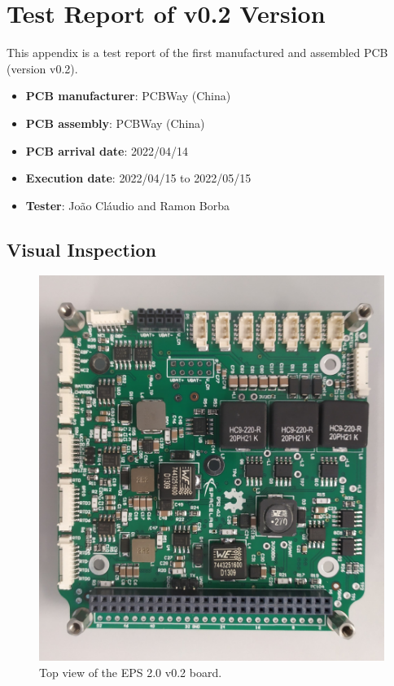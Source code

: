 %
%
%
%
%

%
%
%
%
%
%

\chapter{Test Report of v0.2 Version} \label{anx:test-report-v01}

This appendix is a test report of the first manufactured and assembled PCB (version v0.2).

\begin{itemize}
    \item \textbf{PCB manufacturer}: PCBWay (China)
    \item \textbf{PCB assembly}: PCBWay (China)
    \item \textbf{PCB arrival date}: 2022/04/14 
    \item \textbf{Execution date}: 2022/04/15 to 2022/05/15
    \item \textbf{Tester}: João Cláudio and Ramon Borba
\end{itemize}

\section{Visual Inspection}

\begin{figure}[!ht]
    \begin{center}
        \includegraphics[width=0.6\columnwidth]{figures/v02/eps2-v02-top.jpg}
        \caption{Top view of the EPS 2.0 v0.2 board.}
        \label{fig:eps2-v01-top}
    \end{center}
\end{figure}

